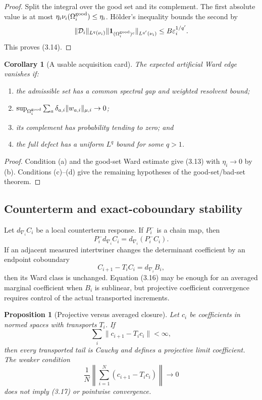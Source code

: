 \documentclass[11pt]{article}
\newtheorem{proposition}[theorem]{Proposition}
\newtheorem{corollary}[theorem]{Corollary}
\begin{document}
\begin{proof}
Split the integral over the good set and its complement.  The first
absolute value is at most \(\eta_i\nu_i(\Omega_i^{\rm good})\leq\eta_i\).
H\"older's inequality bounds the second by
\[
 \|\mathcal D_i\|_{L^q(\nu_i)}
 \|\mathbf 1_{(\Omega_i^{\rm good})^c}\|_{L^{q'}(\nu_i)}
 \leq B\varepsilon_i^{1/q'}.
\]
This proves (3.14).
\end{proof}

\begin{corollary}[A usable acquisition card]
\label{cor:v11v3-acquisition-card}
The expected artificial Ward edge vanishes if:
\begin{enumerate}[label=\textnormal{(\alph*)}]
\item the admissible set has a common spectral gap and weighted resolvent
bound;
\item
\(\sup_{\Omega_i^{\rm good}}\sum_a
 \delta_{a,i}\|w_{a,i}\|_{\mu,i}\to0\);
\item its complement has probability tending to zero; and
\item the full defect has a uniform \(L^q\) bound for some \(q>1\).
\end{enumerate}
\end{corollary}

\begin{proof}
Condition (a) and the good-set Ward estimate give (3.13) with
\(\eta_i\to0\) by (b).  Conditions (c)--(d) give the remaining hypotheses
of the good-set/bad-set theorem.
\end{proof}

\subsection{Counterterm and exact-coboundary stability}

Let \(d_{\nabla_i}C_i\) be a local counterterm response.  If \(P_i^-\) is a
chain map, then
\[
 P_i^-d_{\nabla_i}C_i=d_{\nabla_i}(P_i^-C_i).
 \tag{3.15}
\]
If an adjacent measured intertwiner changes the determinant coefficient
by an endpoint coboundary
\[
 C_{i+1}-T_iC_i=d_{\nabla_i}B_i,
 \tag{3.16}
\]
then its Ward class is unchanged.  Equation (3.16) may be enough for an
averaged marginal coefficient when \(B_i\) is sublinear, but projective
coefficient convergence requires control of the actual transported
increments.

\begin{proposition}[Projective versus averaged closure]
\label{prop:v11v3-projective}
Let \(c_i\) be coefficients in normed spaces with transports \(T_i\).
If
\[
 \sum_i\|c_{i+1}-T_ic_i\|<\infty,
 \tag{3.17}
\]
then every transported tail is Cauchy and defines a projective limit
coefficient.  The weaker condition
\[
 \frac1N\left\|
 \sum_{i=1}^N(c_{i+1}-T_ic_i)
 \right\|\longrightarrow0
 \tag{3.18}
\]
does not imply (3.17) or pointwise convergence.
\end{proposition}
\end{document}
